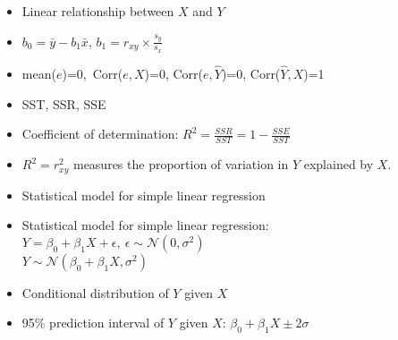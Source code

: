 \documentclass[11pt]{article}
\begin{document}
\begin{itemize}

\item Linear relationship between $X$ and $Y$
\item $b_0=\bar{y}-b_1\bar{x}$, $b_1=r_{xy}\times \frac{s_y}{s_x}$


\item mean($e$)=0,~Corr($e,X$)=0, Corr($e,\hat{Y}$)=0, Corr($\hat{Y},X$)=1
\item SST, SSR, SSE
\item Coefficient of determination: $R^2 = \frac{SSR}{SST} = 1 - \frac{SSE}{SST}$
\item $R^2=r_{xy}^2$ measures the proportion of variation in $Y$ explained by $X$.


\item Statistical model for simple linear regression
\item Statistical model for simple linear regression:\\
$Y=\beta_0+\beta_1 X +\epsilon,~\epsilon\sim\mathcal{N}(0,\sigma^2)$\\
$Y\sim\mathcal{N}(\beta_0+\beta_1X,\sigma^2)$
\item Conditional distribution of $Y$ given $X$

\item 95\% prediction interval of $Y$ given $X$: $ \beta_0+\beta_1X \pm 2\sigma$


\end{itemize}
\end{document}
